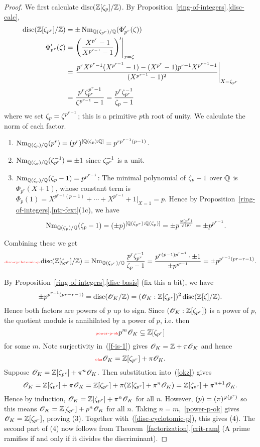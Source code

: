 \begin{proof}
We first calculate $\operatorname{disc}(\mathbb{Z}[\zeta_p]/\mathbb{Z})$. By Proposition~\ref{ring-of-integers}.\ref{disc-calc},
\begin{align*}
\operatorname{disc}(\mathbb{Z}[\zeta_{p^r}]/\mathbb{Z})&=\pm \operatorname{Nm}_{\mathbb{Q}(\zeta_{p^r})/\mathbb{Q}} (\Phi'_{p^r}(\zeta))\\
\Phi'_{p^r}(\zeta)
&=\left.\left( {\frac{X^{p^r}-1}{X^{p^{r-1}}-1}} \right)'\right|_{x=\zeta}\\
&=\left.\frac
{p^rX^{p^r-1}(X^{p^{r-1}}-1)-(X^{p^r}-1)p^{r-1}X^{p^{r-1}-1}}
{(X^{p^{r-1}}-1)^2}\right|_{X=\zeta_{p^r}}\\
&=\frac{p^r\zeta_{p^r}^{p^r-1}}{\zeta^{p^{r-1}}-1}
=\frac{p^r\zeta_{p^r}^{-1}}{\zeta_p-1}
\end{align*}
where we set $\zeta_p=\zeta^{p^{r-1}}$; this is a primitive $p$th root of unity. We calculate the norm of each factor.
\begin{enumerate}
\item $\operatorname{Nm}_{\mathbb{Q}(\zeta_p)/\mathbb{Q}}(p^r)=(p^r)^{[\mathbb{Q}(\zeta_p):\mathbb{Q}]}=p^{rp^{r-1}(p-1)}$.
\item $\operatorname{Nm}_{\mathbb{Q}(\zeta_p)/\mathbb{Q}}(\zeta_{p^r}^{-1})=\pm 1$ since $\zeta_{p^r}^{-1}$ is a unit.
\item $\operatorname{Nm}_{\mathbb{Q}(\zeta_p)/\mathbb{Q}}(\zeta_p-1)=p^{p^{r-1}}$: The minimal polynomial of $\zeta_p-1$ over $\mathbb{Q}$ is 
$\Phi_{p^r}(X+1)$, whose constant term is $\Phi_{p}(1)=X^{p^{r-1}(p-1)}+\cdots +X^{p^{r-1}}+1|_{X=1}=p$. Hence by Proposition~\ref{ring-of-integers}.\ref{ntr-fext}(1c), we have
\[
\operatorname{Nm}_{\mathbb{Q}(\zeta_p)/\mathbb{Q}}(\zeta_p-1)=(\pm p)^{[\mathbb{Q}(\zeta_{p^r}):\mathbb{Q}(\zeta_p)]}
=\pm p^{\frac{\varphi(p^r)}{\varphi(p)}}=\pm p^{p^{r-1}}.
\]
\end{enumerate}
Combining these we get
\begin{equation}\llabel{disc-cyclotomic-p}
\disc(\Z[\ze_{p^r}]/\Z)=\nm_{\Q(\ze_{p^r})/\Q}\frac{p^r \zeta_{p^r}^{-1}}{\ze_p-1}=\frac{p^{r(p-1)p^{r-1}}\cdot \pm1}{\pm p^{p^{r-1}}}=\pm p^{p^{r-1}(pr-r-1)}.
\end{equation}

By Proposition~\ref{ring-of-integers}.\ref{disc-basis} (fix this a bit), we have
\[
\pm p^{p^{r-1}(pr-r-1)}=\operatorname{disc}(\mathscr{O}_K/\mathbb{Z})=(\mathscr{O}_K:\mathbb{Z}[\zeta_{p^r}])^2\operatorname{disc}(\mathbb{Z}[\zeta]/\mathbb{Z}).
\]
Hence both factors are powers of $p$ up to sign. Since $(\mathscr{O}_K:\mathbb{Z}[\zeta_{p^r}])$ is a power of $p$, the quotient module is annihilated by a power of $p$, i.e. then 
\begin{equation}\llabel{power-p-ok}
p^m\sO_K\subeq \Z[\ze_{p^r}]
\end{equation}
for some $m$.  Note surjectivity in~(\ref{f-is-1}) gives $\mathscr{O}_K=\mathbb{Z}+\pi\mathscr{O}_K$ and hence
\begin{equation}\llabel{okz}
\sO_K=\Z[\ze_{p^r}]+\pi\sO_K.
\end{equation}
Suppose $\mathscr{O}_K=\mathbb{Z}[\zeta_{p^r}]+\pi^n\mathscr{O}_K$. Then substitution into~(\ref{okz}) gives
\[
\mathscr{O}_K=\mathbb{Z}[\zeta_{p^r}]+\pi\mathscr{O}_K=\mathbb{Z}[\zeta_{p^r}]+\pi(\mathbb{Z}[\zeta_{p^r}]+\pi^n\mathscr{O}_K) =\mathbb{Z}[\zeta_{p^r}]+\pi^{n+1}\mathscr{O}_K.
\]
Hence by induction, $\mathscr{O}_K=\mathbb{Z}[\zeta_{p^r}]+\pi^n\mathscr{O}_K$ for all $n$. However, $(p)=(\pi)^{\varphi(p^r)}$ so this means $\mathscr{O}_K=\mathbb{Z}[\zeta_{p^r}]+p^n\mathscr{O}_K$ for all $n$. Taking $n=m$,~\eqref{power-p-ok} gives $\mathscr{O}_K=\mathbb{Z}[\zeta_{p^r}]$, proving (3). Together with~(\ref{disc-cyclotomic-p}), this gives (4). The second part of (4) now follows from Theorem~\ref{factorization}.\ref{crit-ram} (A prime ramifies if and only if it divides the discriminant).


\end{proof}
